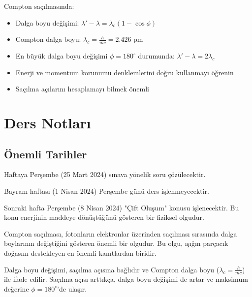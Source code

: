 \documentclass[11pt,letterpaper]{fenbil}
\begin{document}
\begin{tcolorbox}[title=\textbf{SINAV İÇİN}]
Compton saçılmasında:
\begin{itemize}
\item Dalga boyu değişimi: $\lambda' - \lambda = \lambda_c(1 - \cos\phi)$
\item Compton dalga boyu: $\lambda_c = \frac{h}{mc} = 2.426 \text{ pm}$
\item En büyük dalga boyu değişimi $\phi = 180^\circ$ durumunda: $\lambda' - \lambda = 2\lambda_c$
\item Enerji ve momentum korunumu denklemlerini doğru kullanmayı öğrenin
\item Saçılma açılarını hesaplamayı bilmek önemli
\end{itemize}
\end{tcolorbox}

\section{Ders Notları}

\subsection{Önemli Tarihler}

Haftaya Perşembe (25 Mart 2024) sınava yönelik soru çözülecektir.

Bayram haftası (1 Nisan 2024) Perşembe günü ders işlenmeyecektir.

Sonraki hafta Perşembe (8 Nisan 2024) "Çift Oluşum" konusu işlenecektir. Bu konu enerjinin maddeye dönüştüğünü gösteren bir fiziksel olgudur.

\begin{tcolorbox}[title=\textbf{Compton Saçılması Özeti}]
Compton saçılması, fotonların elektronlar üzerinden saçılması sırasında dalga boylarının değiştiğini gösteren önemli bir olgudur. Bu olgu, ışığın parçacık doğasını destekleyen en önemli kanıtlardan biridir.

Dalga boyu değişimi, saçılma açısına bağlıdır ve Compton dalga boyu ($\lambda_c = \frac{h}{mc}$) ile ifade edilir. Saçılma açısı arttıkça, dalga boyu değişimi de artar ve maksimum değerine $\phi = 180^\circ$'de ulaşır.
\end{tcolorbox}
\end{document}
